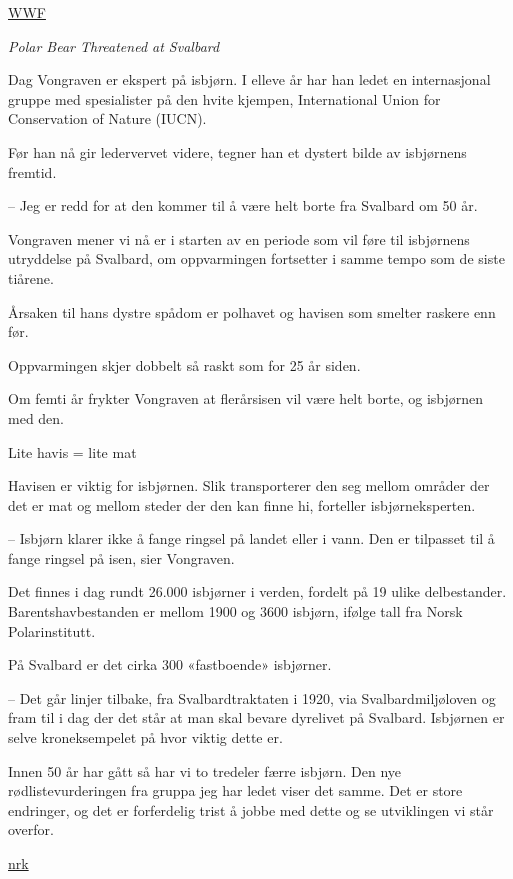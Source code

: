 \documentclass[
]{book}
\begin{document}
\href{https://arcticwwf.org/species/polar-bear/population/}{WWF}

\emph{Polar Bear Threatened at Svalbard}

Dag Vongraven er ekspert på isbjørn. I elleve år har han ledet en internasjonal gruppe med spesialister på den hvite kjempen, International Union for Conservation of Nature (IUCN).

Før han nå gir ledervervet videre, tegner han et dystert bilde av isbjørnens fremtid.

-- Jeg er redd for at den kommer til å være helt borte fra Svalbard om 50 år.

Vongraven mener vi nå er i starten av en periode som vil føre til isbjørnens utryddelse på Svalbard, om oppvarmingen fortsetter i samme tempo som de siste tiårene.

Årsaken til hans dystre spådom er polhavet og havisen som smelter raskere enn før.

Oppvarmingen skjer dobbelt så raskt som for 25 år siden.

Om femti år frykter Vongraven at flerårsisen vil være helt borte, og isbjørnen med den.

Lite havis = lite mat

Havisen er viktig for isbjørnen. Slik transporterer den seg mellom områder der det er mat og mellom steder der den kan finne hi, forteller isbjørneksperten.

-- Isbjørn klarer ikke å fange ringsel på landet eller i vann. Den er tilpasset til å fange ringsel på isen, sier Vongraven.

Det finnes i dag rundt 26.000 isbjørner i verden, fordelt på 19 ulike delbestander. Barentshavbestanden er mellom 1900 og 3600 isbjørn, ifølge tall fra Norsk Polarinstitutt.

På Svalbard er det cirka 300 «fastboende» isbjørner.

-- Det går linjer tilbake, fra Svalbardtraktaten i 1920, via Svalbardmiljøloven og fram til i dag der det står at man skal bevare dyrelivet på Svalbard. Isbjørnen er selve kroneksempelet på hvor viktig dette er.

Innen 50 år har gått så har vi to tredeler færre isbjørn. Den nye rødlistevurderingen fra gruppa jeg har ledet viser det samme. Det er store endringer, og det er forferdelig trist å jobbe med dette og se utviklingen vi står overfor.

\href{https://www.nrk.no/tromsogfinnmark/mener-isbjorn-kan-vaere-utryddet-pa-svalbard-om-50-ar-1.15559199}{nrk}
\end{document}
